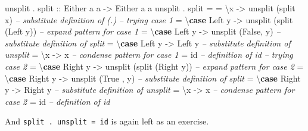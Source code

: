 \documentclass[]{article}
\newenvironment{Shaded}{}{}
\newcommand{\CommentTok}[1]{\textcolor[rgb]{0.38,0.63,0.69}{\textit{#1}}}
\newcommand{\DataTypeTok}[1]{\textcolor[rgb]{0.56,0.13,0.00}{#1}}
\newcommand{\FunctionTok}[1]{\textcolor[rgb]{0.02,0.16,0.49}{#1}}
\newcommand{\KeywordTok}[1]{\textcolor[rgb]{0.00,0.44,0.13}{\textbf{#1}}}
\newcommand{\NormalTok}[1]{#1}
\newcommand{\OtherTok}[1]{\textcolor[rgb]{0.00,0.44,0.13}{#1}}
\begin{document}
\begin{Shaded}
\begin{Highlighting}[]
\NormalTok{unsplit }\FunctionTok{.}\OtherTok{ split ::} \DataTypeTok{Either}\NormalTok{ a a }\OtherTok{->} \DataTypeTok{Either}\NormalTok{ a a}
\NormalTok{unsplit }\FunctionTok{.}\NormalTok{ split }\FunctionTok{=}
    \FunctionTok{=}\NormalTok{ \textbackslash{}x            }\OtherTok{->}\NormalTok{ unsplit (split x)          }\CommentTok{-- substitute definition of (.)}
      \CommentTok{-- trying case 1}
    \FunctionTok{=}\NormalTok{ \textbackslash{}}\KeywordTok{case} \DataTypeTok{Left}\NormalTok{  y }\OtherTok{->}\NormalTok{ unsplit (split (}\DataTypeTok{Left}\NormalTok{  y))  }\CommentTok{-- expand pattern for case 1}
    \FunctionTok{=}\NormalTok{ \textbackslash{}}\KeywordTok{case} \DataTypeTok{Left}\NormalTok{  y }\OtherTok{->}\NormalTok{ unsplit (}\DataTypeTok{False}\NormalTok{, y)         }\CommentTok{-- substitute definition of split}
    \FunctionTok{=}\NormalTok{ \textbackslash{}}\KeywordTok{case} \DataTypeTok{Left}\NormalTok{  y }\OtherTok{->} \DataTypeTok{Left}\NormalTok{  y                    }\CommentTok{-- substitute definition of unsplit}
    \FunctionTok{=}\NormalTok{ \textbackslash{}x            }\OtherTok{->}\NormalTok{ x                          }\CommentTok{-- condense pattern for case 1}
    \FunctionTok{=} \FunctionTok{id}                                          \CommentTok{-- definition of id}
      \CommentTok{-- trying case 2}
    \FunctionTok{=}\NormalTok{ \textbackslash{}}\KeywordTok{case} \DataTypeTok{Right}\NormalTok{ y }\OtherTok{->}\NormalTok{ unsplit (split (}\DataTypeTok{Right}\NormalTok{ y))  }\CommentTok{-- expand pattern for case 2}
    \FunctionTok{=}\NormalTok{ \textbackslash{}}\KeywordTok{case} \DataTypeTok{Right}\NormalTok{ y }\OtherTok{->}\NormalTok{ unsplit (}\DataTypeTok{True}\NormalTok{ , y)         }\CommentTok{-- substitute definition of split}
    \FunctionTok{=}\NormalTok{ \textbackslash{}}\KeywordTok{case} \DataTypeTok{Right}\NormalTok{ y }\OtherTok{->} \DataTypeTok{Right}\NormalTok{ y                    }\CommentTok{-- substitute definition of unsplit}
    \FunctionTok{=}\NormalTok{ \textbackslash{}x            }\OtherTok{->}\NormalTok{ x                          }\CommentTok{-- condense pattern for case 2}
    \FunctionTok{=} \FunctionTok{id}                                          \CommentTok{-- definition of id}
\end{Highlighting}
\end{Shaded}

And \texttt{split\ .\ unsplit\ =\ id} is again left as an exercise.
\end{document}
